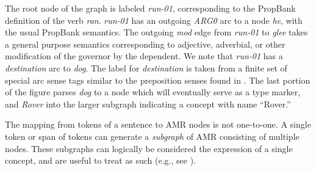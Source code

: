 \documentclass[11pt]{article}
\newcommand\w[1]{\textit{#1}} %
\newcommand\e[1]{\textit{#1}} %
\newcommand\n[1]{\textit{#1}} %
\begin{document}
The root node of the graph is labeled \n{run-01}, corresponding to the PropBank \cite{palmer2005proposition-srl} definition of the verb \w{ran}.
\w{run-01} has an outgoing \e{ARG0} arc to a node \w{he}, with the usual PropBank semantics.
The outgoing \e{mod} edge from \n{run-01} to \n{glee} takes a general purpose semantics corresponding to adjective, adverbial, or other modification of the governor by the dependent.
We note that \n{run-01} has a \e{destination} arc to \n{dog}.
The label for \e{destination} is taken from a finite set of special arc sense tags similar to the preposition senses found in \cite{srikumar2013-srl}.
The last portion of the figure parses \w{dog} to a node which will eventually serve as a type marker, and \w{Rover} into the larger subgraph indicating a concept with name ``Rover.''


%


The mapping from tokens of a sentence to AMR nodes is not one-to-one.
A single token or span of tokens can generate a \textit{subgraph} of AMR consisting
  of multiple nodes.
These subgraphs can logically be considered the expression of a single concept,
  and are useful to treat as such (e.g., see ).
\end{document}
